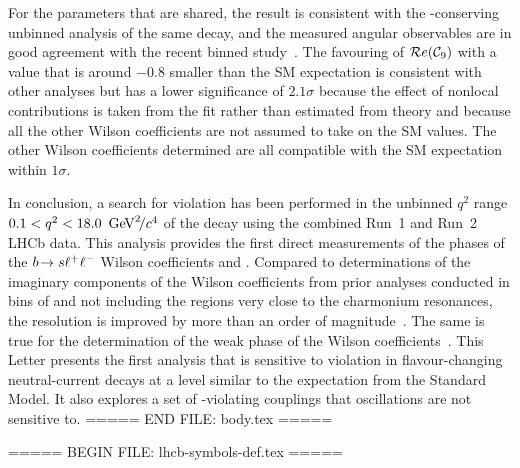 For the parameters that are shared, the result is consistent with the \CP-conserving unbinned analysis of the same decay, and the measured angular observables are in good agreement with the recent binned \BdbToKstbMuMu study~\cite{LHCb-PAPER-2025-041}. The favouring of $\mathcal{R}e(\mathcal{C}_9)$ with a value that is around $-0.8$ smaller than the SM expectation is consistent with other analyses but has a lower significance of $2.1\sigma$ because the effect of nonlocal contributions is taken from the fit rather than estimated from theory and because all the other Wilson coefficients are not assumed to take on the SM values. The other Wilson coefficients determined are all compatible with the SM expectation within $1\sigma$.

In conclusion, a search for \CP violation has been performed in the unbinned $q^2$ range \mbox{$0.1 < {q^2} < 18.0~\text{\,Ge\kern -0.1em V}^2\!/c^4$} of the \BdbToKstbMuMu decay using the combined Run~1 and Run~2 LHCb data. This analysis provides the first direct measurements of the phases of the ${b}\!\rightarrow {\ensuremath{s}} \ell^+ \ell^-$ Wilson coefficients  and  . Compared to determinations of the imaginary components of the Wilson coefficients from prior analyses conducted in bins of \qsq and not including the regions very close to the charmonium resonances, the resolution is improved by more than an order of magnitude~\cite{Fleischer:2025ucq}. The same is true for the determination of the weak phase of the Wilson coefficients~\cite{LHCb-PAPER-2025-062}. This Letter presents the first analysis that is sensitive to \CP violation in flavour-changing neutral-current decays at a level similar to the expectation from the Standard Model. It also explores a set of \CP-violating couplings that \Bs oscillations are not sensitive to.
===== END FILE: body.tex =====

===== BEGIN FILE: lhcb-symbols-def.tex =====























\usepackage{xspace}
\usepackage{upgreek}



















